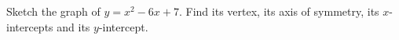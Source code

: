 Sketch the graph of $y=x^2-6x+7$. Find its vertex, its axis of symmetry, its $x$-intercepts and its $y$-intercept.
